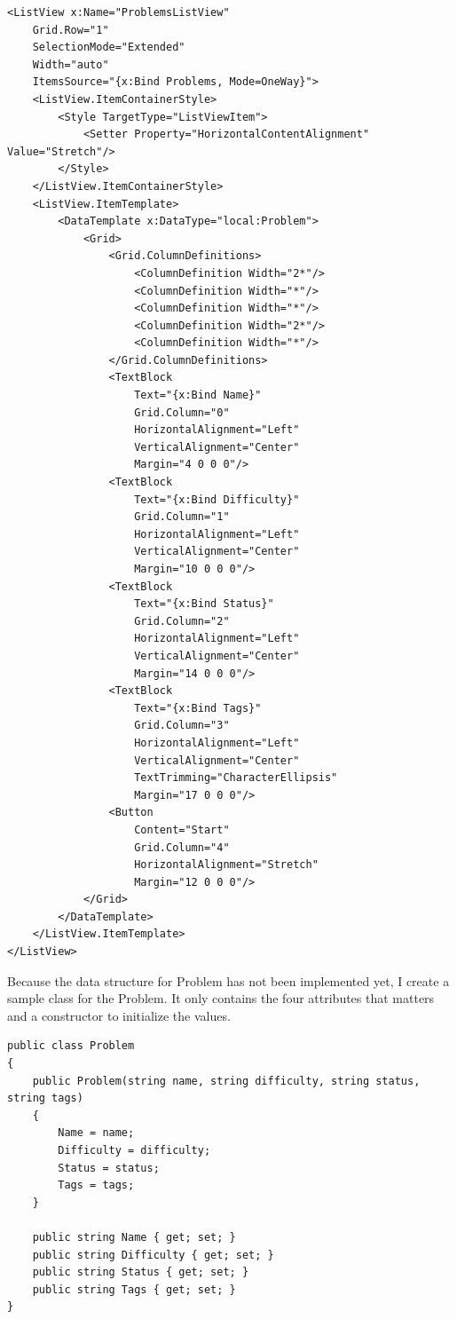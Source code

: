 \documentclass[a4paper]{report}
\begin{document}
\begin{verbatim}
<ListView x:Name="ProblemsListView"
    Grid.Row="1"
    SelectionMode="Extended"
    Width="auto"
    ItemsSource="{x:Bind Problems, Mode=OneWay}">
    <ListView.ItemContainerStyle>
        <Style TargetType="ListViewItem">
            <Setter Property="HorizontalContentAlignment" Value="Stretch"/>
        </Style>
    </ListView.ItemContainerStyle>
    <ListView.ItemTemplate>
        <DataTemplate x:DataType="local:Problem">
            <Grid>
                <Grid.ColumnDefinitions>
                    <ColumnDefinition Width="2*"/>
                    <ColumnDefinition Width="*"/>
                    <ColumnDefinition Width="*"/>
                    <ColumnDefinition Width="2*"/>
                    <ColumnDefinition Width="*"/>
                </Grid.ColumnDefinitions>
                <TextBlock
                    Text="{x:Bind Name}"
                    Grid.Column="0"
                    HorizontalAlignment="Left"
                    VerticalAlignment="Center"
                    Margin="4 0 0 0"/>
                <TextBlock
                    Text="{x:Bind Difficulty}"
                    Grid.Column="1"
                    HorizontalAlignment="Left"
                    VerticalAlignment="Center"
                    Margin="10 0 0 0"/>
                <TextBlock
                    Text="{x:Bind Status}"
                    Grid.Column="2"
                    HorizontalAlignment="Left"
                    VerticalAlignment="Center"
                    Margin="14 0 0 0"/>
                <TextBlock
                    Text="{x:Bind Tags}"
                    Grid.Column="3"
                    HorizontalAlignment="Left"
                    VerticalAlignment="Center"
                    TextTrimming="CharacterEllipsis"
                    Margin="17 0 0 0"/>
                <Button
                    Content="Start"
                    Grid.Column="4"
                    HorizontalAlignment="Stretch"
                    Margin="12 0 0 0"/>
            </Grid>
        </DataTemplate>
    </ListView.ItemTemplate>
</ListView>
\end{verbatim}

Because the data structure for Problem has not been implemented yet, I create a sample class for the Problem. It only contains the four attributes that matters and a constructor to initialize the values.

\begin{verbatim}
public class Problem
{
    public Problem(string name, string difficulty, string status, string tags)
    {
        Name = name;
        Difficulty = difficulty;
        Status = status;
        Tags = tags;
    }

    public string Name { get; set; }
    public string Difficulty { get; set; }
    public string Status { get; set; }
    public string Tags { get; set; }
}
\end{verbatim}
\end{document}
